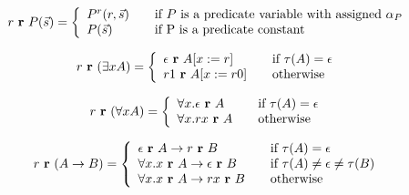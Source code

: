 \[ r \ \textbf{r} \ P(\vec{s}) = \left\{ 
\begin{array}{l l}
P^r(r,\vec{s}) & \quad \text{if $P$ is a predicate variable with assigned $\alpha_P$} \\ 
P(\vec{s}) & \quad \text{if P is a predicate constant} \\

\end{array} \right.
\]

\[ r \ \textbf{r} \ (\exists x A) = \left\{ 
\begin{array}{l l}
\epsilon \ \textbf{r} \ A[x:=r] & \quad \text{if $\tau (A) = \epsilon$} \\ 
r1 \ \textbf{r} \ A[x:= r0] & \quad \text{otherwise} \\

\end{array} \right.
\]

\[ r \ \textbf{r} \ (\forall x A) = \left\{ 
\begin{array}{l l}
\forall x. \epsilon \ \textbf{r} \ A & \quad \text{if $\tau (A) = \epsilon$} \\ 
\forall x. rx \ \textbf{r} \ A & \quad \text{otherwise} \\

\end{array} \right.
\]

\[ r \ \textbf{r} \ (A \to B) = \left\{ 
\begin{array}{l l}
\epsilon \ \textbf{r} \ A \to r \ \textbf{r} \ B & \quad \text{if $\tau (A) = \epsilon$} \\ 
\forall x.x \ \textbf{r} \ A \to \epsilon \ \textbf{r} \ B & \quad \text{if
  $\tau (A) \neq \epsilon \neq \tau (B)$} \\
\forall x. x \ \textbf{r} \ A \to r x  \ \textbf{r} \ B & \quad \text{otherwise} \\

\end{array} \right.
\]


